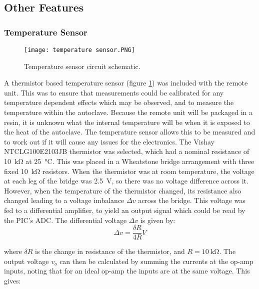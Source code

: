 \subsection{Other Features}

\subsubsection{Temperature Sensor}
\begin{figure}[htbp]
	\centering
	\texttt{[image: temperature sensor.PNG]}
	\caption{Temperature sensor circuit schematic.}
	\label{fig: temperature sensor}
\end{figure}

A thermistor based temperature sensor (figure \ref{fig: temperature sensor}) was included with the remote unit. This was to ensure that measurements could be calibrated for any temperature dependent effects which may be observed, and to measure the temperature within the autoclave. Because the remote unit will be packaged in a resin, it is unknown what the internal temperature will be when it is exposed to the heat of the autoclave. The temperature sensor allows this to be measured and to work out if it will cause any issues for the electronics. The Vishay NTCLG100E2103JB \cite{thermistor} thermistor was selected, which had a nominal resistance of \SI{10}{\kilo\ohm} at \SI{25}{\celsius}. This was placed in a Wheatstone bridge arrangement with three fixed \SI{10}{\kilo\ohm} resistors. When the thermistor was at room temperature, the voltage at each leg of the bridge was \SI{2.5}{\volt}, so there was no voltage difference across it. However, when the temperature of the thermistor changed, its resistance also changed leading to a voltage imbalance $\Delta v$ across the bridge. This voltage was fed to a differential amplifier, to yield an output signal which could be read by the PIC's ADC. The differential voltage $\Delta v$ is given by:\\

\begin{equation}
\Delta v = \frac{\delta R}{4 R}V
\end{equation}

where $\delta R$ is the change in resistance of the thermistor, and $R=\SI{10}{\kilo\ohm}$. The output voltage $v_o$ can then be calculated by summing the currents at the op-amp inputs, noting that for an ideal op-amp the inputs are at the same voltage. This gives:\\

